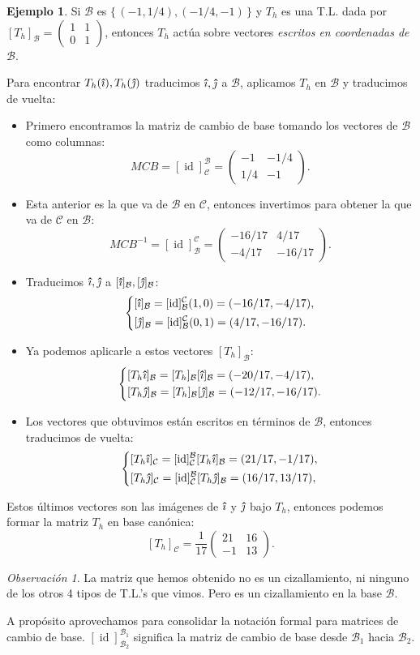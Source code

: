 \documentclass[12pt]{article}
\theoremstyle{plain}
\theoremstyle{definition}
\newtheorem{Ex}[Th]{Ejemplo}           %
\theoremstyle{remark}
\newtheorem*{Rmk}{Observación}      %
\DeclareMathOperator{\id}{id}       %
\newcommand{\ii}{\vu{\imath}}
\newcommand{\jj}{\vu{\jmath}}
\newcommand{\cB}{\mathcal{B}}       %
\newcommand{\cC}{\mathcal{C}}       %
\renewcommand{\:}{\colon}           %
\renewcommand{\.}{\Cdot}                %
\newcommand{\twobytwo}[4]{\begin{pmatrix} %
    #1 & #2 \\ #3 & #4 \end{pmatrix}}
\newcommand{\set}[1]{\{\,#1\,\}}    %
\begin{document}
\begin{multicols}{2}
\begin{Ex} 
Si $\cB$ es $\set{(-1,1/4),(-1/4,-1)}$ y $T_h$ es una T.L. dada por $[T_h]_\cB=\twobytwo{1}{1}{0}{1}$, entonces $T_h$ actúa sobre vectores \emph{escritos en coordenadas de} $\cB$.\par 
Para encontrar $T_h(\ii),T_h(\jj)$ traducimos $\ii,\jj$ a $\cB$, aplicamos $T_h$ en $\cB$ y traducimos de vuelta:
\begin{itemize}
  \itemsep=-0.48em
  \item Primero encontramos la matriz de cambio de base tomando los vectores de $\cB$ como columnas:
  $$MCB=[\id]^\cB_\cC=\twobytwo{-1}{-1/4}{1/4}{-1}.$$
  \item Esta anterior es la que va de $\cB$ en $\cC$, entonces invertimos para obtener la que va de $\cC$ en $\cB$:
  $$MCB^{-1}=[\id]^\cC_\cB=\twobytwo{-16/17}{4/17}{-4/17}{-16/17}.$$
  \item Traducimos $\ii,\jj$ a $[\ii]_\cB,[\jj]_\cB$:
  $$\left\lbrace
  \begin{aligned}
    &[\ii]_\cB=[\id]^\cC_\cB(1,0)=(-16/17,-4/17),\\
    &[\jj]_\cB=[\id]^\cC_\cB(0,1)=(4/17,-16/17).
  \end{aligned}
  \right.$$
  \item Ya podemos aplicarle a estos vectores $[T_h]_\cB$:
  $$\left\lbrace
  \begin{aligned}
    &[T_h\ii]_\cB=[T_h]_\cB[\ii]_\cB=(-20/17,-4/17),\\
    &[T_h\jj]_\cB=[T_h]_\cB[\jj]_\cB=(-12/17,-16/17).
  \end{aligned}
  \right.$$
  \item Los vectores que obtuvimos están escritos en términos de $\cB$, entonces traducimos de vuelta:
  $$\left\lbrace
  \begin{aligned}
    &[T_h\ii]_\cC=[\id]^{\cB}_\cC[T_h\ii]_\cB=(21/17,-1/17),\\
    &[T_h\jj]_\cC=[\id]^{\cB}_\cC[T_h\jj]_\cB=(16/17,13/17),\\
  \end{aligned}
  \right.$$
\end{itemize}
Estos últimos vectores son las imágenes de $\ii$ y $\jj$ bajo $T_h$, entonces podemos formar la matriz $T_h$ en base canónica:
$$[T_h]_\cC=\frac{1}{17}\twobytwo{21}{16}{-1}{13}.$$
\end{Ex}

\begin{Rmk}
La matriz que hemos obtenido no es un cizallamiento, ni ninguno de los otros 4 tipos de T.L.'s que vimos. Pero es un cizallamiento en la base $\cB$.\par 
A propósito aprovechamos para consolidar la notación formal para matrices de cambio de base. $[\id]^{\cB_1}_{\cB_2}$ significa la matriz de cambio de base desde $\cB_1$ hacia $\cB_2$.
\end{Rmk} 

\end{multicols}
\end{document}
